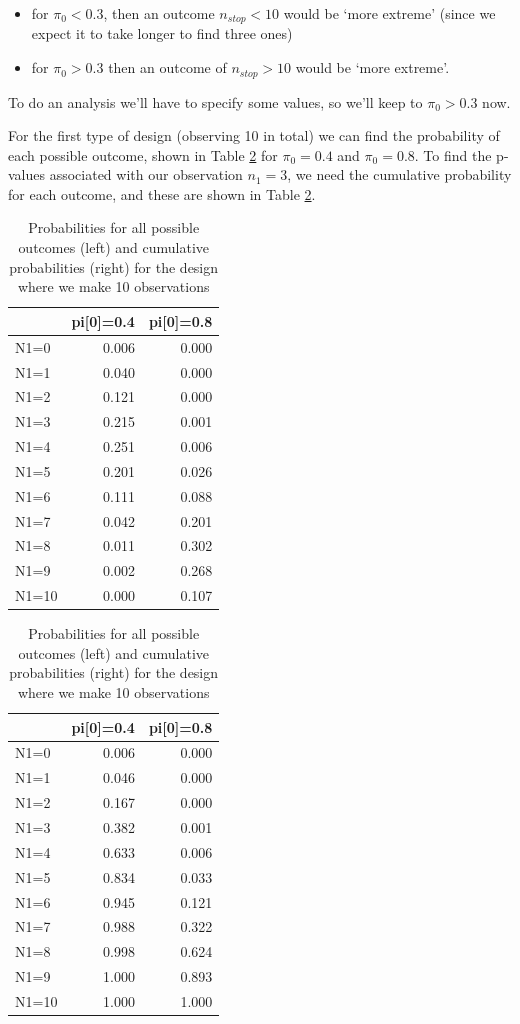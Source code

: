 \documentclass[
  openany]{book}
\providecommand{\tightlist}{%
  \setlength{\itemsep}{0pt}\setlength{\parskip}{0pt}}
\theoremstyle{definition}
\theoremstyle{definition}
\theoremstyle{definition}
\theoremstyle{definition}
\theoremstyle{remark}
\begin{document}
\begin{itemize}
\tightlist
\item
  for \(\pi_0<0.3\), then an outcome \(n_{stop}<10\) would be `more extreme' (since we expect it to take longer to find three ones)
\item
  for \(\pi_0>0.3\) then an outcome of \(n_{stop}>10\) would be `more extreme'.
\end{itemize}

To do an analysis we'll have to specify some values, so we'll keep to \(\pi_0>0.3\) now.

For the first type of design (observing 10 in total) we can find the probability of each possible outcome, shown in Table \ref{tab:bin1} for \(\pi_0=0.4\) and \(\pi_0=0.8\). To find the p-values associated with our observation \(n_1=3\), we need the cumulative probability for each outcome, and these are shown in Table \ref{tab:bin1}.

\begin{table}
\caption{\label{tab:bin1}Probabilities for all possible outcomes (left) and cumulative probabilities (right) for the design where we make 10 observations}

\centering
\begin{tabular}[t]{lrr}
\toprule
  & pi[0]=0.4 & pi[0]=0.8\\
\midrule
N1=0 & 0.006 & 0.000\\
N1=1 & 0.040 & 0.000\\
N1=2 & 0.121 & 0.000\\
N1=3 & 0.215 & 0.001\\
N1=4 & 0.251 & 0.006\\
\addlinespace
N1=5 & 0.201 & 0.026\\
N1=6 & 0.111 & 0.088\\
N1=7 & 0.042 & 0.201\\
N1=8 & 0.011 & 0.302\\
N1=9 & 0.002 & 0.268\\
\addlinespace
N1=10 & 0.000 & 0.107\\
\bottomrule
\end{tabular}
\centering
\begin{tabular}[t]{lrr}
\toprule
  & pi[0]=0.4 & pi[0]=0.8\\
\midrule
N1=0 & 0.006 & 0.000\\
N1=1 & 0.046 & 0.000\\
N1=2 & 0.167 & 0.000\\
N1=3 & 0.382 & 0.001\\
N1=4 & 0.633 & 0.006\\
\addlinespace
N1=5 & 0.834 & 0.033\\
N1=6 & 0.945 & 0.121\\
N1=7 & 0.988 & 0.322\\
N1=8 & 0.998 & 0.624\\
N1=9 & 1.000 & 0.893\\
\addlinespace
N1=10 & 1.000 & 1.000\\
\bottomrule
\end{tabular}
\end{table}
\end{document}
